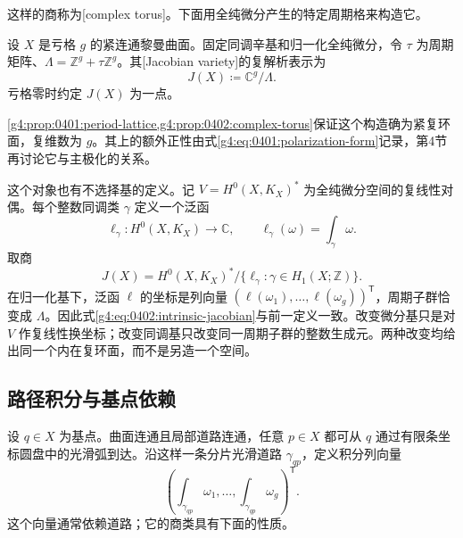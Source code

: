 这样的商称为[complex torus]。下面用全纯微分产生的特定周期格来构造它。

\begin{definition}
	\label{g4:def:0402:jacobian}
	设 \(X\) 是亏格 \(g\) 的紧连通黎曼曲面。固定同调辛基和归一化全纯微分，令 \(\tau\) 为周期矩阵、\(\Lambda=\mathbb Z^g+\tau\mathbb Z^g\)。其[Jacobian variety]的复解析表示为
	\[
		J(X)\coloneqq\mathbb C^g/\Lambda.
	\]
	亏格零时约定 \(J(X)\) 为一点。
\end{definition}

\cref{g4:prop:0401:period-lattice,g4:prop:0402:complex-torus}保证这个构造确为紧复环面，复维数为 \(g\)。其上的额外正性由式\eqref{g4:eq:0401:polarization-form}记录，第4节再讨论它与主极化的关系。

\ProseParagraphBreak

这个对象也有不选择基的定义。记 \(V=H^0(X,K_X)^*\) 为全纯微分空间的复线性对偶。每个整数同调类 \(\gamma\) 定义一个泛函
\[
	\ell_\gamma:H^0(X,K_X)\longrightarrow\mathbb C,
	\qquad \ell_\gamma(\omega)=\int_\gamma\omega.
\]
取商
\begin{equation}\label{g4:eq:0402:intrinsic-jacobian}
	J(X)=H^0(X,K_X)^*/\{\ell_\gamma:\gamma\in H_1(X;\mathbb Z)\}.
\end{equation}
在归一化基下，泛函 \(\ell\) 的坐标是列向量
\((\ell(\omega_1),\ldots,\ell(\omega_g))^{\mathsf T}\)，周期子群恰变成 \(\Lambda\)。因此式\eqref{g4:eq:0402:intrinsic-jacobian}与前一定义一致。改变微分基只是对 \(V\) 作复线性换坐标；改变同调基只改变同一周期子群的整数生成元。两种改变均给出同一个内在复环面，而不是另造一个空间。

\subsection{路径积分与基点依赖}
\label{g4:subsec:0402:02}

设 \(q\in X\) 为基点。曲面连通且局部道路连通，任意 \(p\in X\) 都可从 \(q\) 通过有限条坐标圆盘中的光滑弧到达。沿这样一条分片光滑道路 \(\gamma_{qp}\)，定义积分列向量
\[
	\left(\int_{\gamma_{qp}}\omega_1,\ldots,
	\int_{\gamma_{qp}}\omega_g\right)^{\mathsf T}.
\]
这个向量通常依赖道路；它的商类具有下面的性质。

